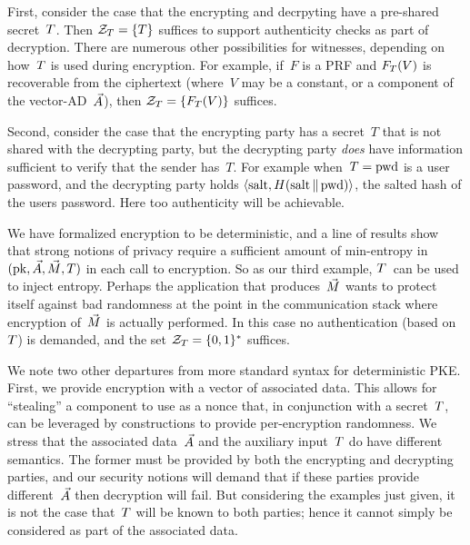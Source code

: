 First, consider the case that the encrypting and decrpyting have a pre-shared secret~$T$.  Then $\mathcal{Z}_T=\{T\}$ suffices to support authenticity checks as part of decryption.  There are numerous other possibilities for witnesses, depending on how~$T$ is used during encryption.  For example, if~$F$ is a PRF and $F_T(V)$ is recoverable from the ciphertext (where~$V$ may be a constant, or a component of the vector-AD~$\vec{A}$), then $\mathcal{Z}_T=\{F_T(V)\}$ suffices.  

Second, consider the case that the encrypting party has a secret~$T$ that is not shared with the decrypting party, but the decrypting party \emph{does} have information sufficient to verify that the sender has~$T$.  For example when~$T=\mathrm{pwd}$ is a user password, and the decrypting party holds $\langle \mathrm{salt},H(\mathrm{salt} \,\|\, \mathrm{pwd})\rangle$, the salted hash of the users password.  Here too authenticity will be achievable.

We have formalized encryption to be deterministic, and a line of results \cite{xxx,yyy,zzz} show that strong notions of privacy require a sufficient amount of min-entropy in $(\mathrm{pk},\vec{A},\vec{M},T)$ in each call to encryption.  
So as our third example, $T$~can be used to inject entropy.  
Perhaps the application that produces~$\vec{M}$ wants to protect itself against bad randomness at the point in the communication stack where encryption of~$\vec{M}$ is actually performed.  In this case no authentication (based on~$T$) is demanded, and the set $\mathcal{Z}_T=\{0,1\}^*$ suffices.

We note two other departures from more standard syntax for deterministic PKE.  First, we provide encryption with a vector of associated data.  This allows for ``stealing'' a component to use as a nonce that, in conjunction with a secret~$T$, can be leveraged by constructions to provide per-encryption randomness.  We stress that the associated data~$\vec{A}$ and the auxiliary input~$T$ do have different semantics.  The former must be provided by both the encrypting and decrypting parties, and our security notions will demand that if these parties provide different~$\vec{A}$ then decryption will fail.  But considering the examples just given, it is not the case that~$T$ will be known to both parties; hence it cannot simply be considered as part of the associated data.

